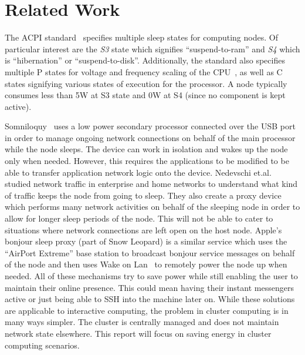 \section{Related Work} %
\label{sec:related_work}

The ACPI standard~\cite{acpi} specifies multiple sleep states for computing nodes. Of particular interest are the {\em S3} state which signifies ``suspend-to-ram'' and {\em S4} which is ``hibernation'' or ``suspend-to-disk''. Additionally, the standard also specifies multiple P states for voltage and frequency scaling of the CPU~\cite{Bo:04}, as well as C states signifying various states of execution for the processor. A node typically consumes less than 5W at S3 state and 0W at S4 (since no component is kept active). %

Somniloquy~\cite{Yuvraj:09} uses a low power secondary processor connected over the USB port in order to manage ongoing network connections on behalf of the main processor while the node sleeps. The device can work in isolation and wakes up the node only when needed. However, this requires the applications to be modified to be able to transfer application network logic onto the device. Nedevschi et.al.~\cite{Sergiu:09} studied network traffic in enterprise and home networks to understand what kind of traffic keeps the node from going to sleep. They also create a proxy device which performs many network activities on behalf of the sleeping node in order to allow for longer sleep periods of the node. This will not be able to cater to situations where network connections are left open on the host node. Apple's bonjour sleep proxy (part of Snow Leopard) is a similar service which uses the ``AirPort Extreme'' base station to broadcast bonjour service messages on behalf of the node and then uses Wake on Lan~\cite{wol} to remotely power the node up when needed. All of these mechanisms try to save power while still enabling the user to maintain their online presence. This could mean having their instant messengers active or just being able to SSH into the machine later on. While these solutions are applicable to interactive computing, the problem in cluster computing is in many ways simpler. The cluster is centrally managed and does not maintain network state elsewhere. This report will focus on saving energy in cluster computing scenarios.

